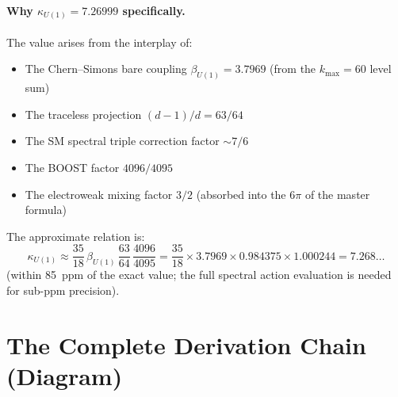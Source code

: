 \documentclass[12pt,a4paper]{article}
\begin{document}
\paragraph{Why $\kappa_{U(1)} = 7.26999$ specifically.}
The value arises from the interplay of:
\begin{itemize}
\item The Chern--Simons bare coupling $\beta_{U(1)} = 3.7969$
  (from the $k_{\max} = 60$ level sum)
\item The traceless projection $(d-1)/d = 63/64$
\item The SM spectral triple correction factor $\sim 7/6$
\item The BOOST factor $4096/4095$
\item The electroweak mixing factor $3/2$
  (absorbed into the $6\pi$ of the master formula)
\end{itemize}

The approximate relation is:
\begin{equation}
\kappa_{U(1)} \approx \frac{35}{18}\,\beta_{U(1)}\,\frac{63}{64}
\,\frac{4096}{4095}
= \frac{35}{18} \times 3.7969 \times 0.984375 \times 1.000244
= 7.268\ldots
\end{equation}
(within 85~ppm of the exact value; the full spectral action evaluation
is needed for sub-ppm precision).

\section{The Complete Derivation Chain (Diagram)}
\label{sec:diagram}
\end{document}
